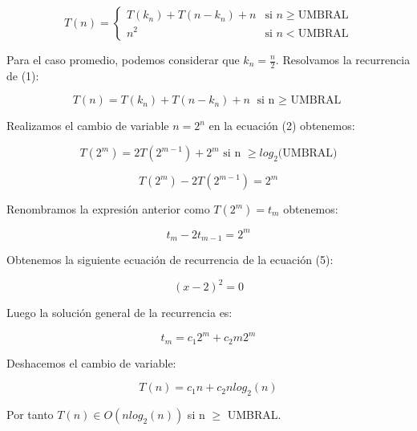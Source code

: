 \documentclass{homework}
\begin{document}
    \begin{equation}
        T(n) = \left\{ \begin{array}{lr} T(k_n) + T(n-k_n) + n & \text{si } n \geq \text{UMBRAL}\\ n^2 & \text{si } n < \text{UMBRAL} \end{array} \right.
    \end{equation}

    Para el caso promedio, podemos considerar que $k_{n} = \frac{n}{2}$. Resolvamos la recurrencia de (1):
    
    \begin{equation}
        T(n) = T(k_n) + T(n-k_n) + n \text{ si n $\geq$ UMBRAL}
    \end{equation}

    Realizamos el cambio de variable $n = 2^{n}$ en la ecuación (2) obtenemos:

    \begin{equation}
        T(2^{m}) = 2T(2^{m-1}) + 2^{m} \text{ si n $\geq log_{2}$(UMBRAL)} 
    \end{equation}

    \begin{equation}
        T(2^{m}) - 2T(2^{m-1}) = 2^{m}
    \end{equation}

    Renombramos la expresión anterior como $T(2^{m}) = t_{m}$ obtenemos:

    \begin{equation}
        t_{m} - 2t_{m-1} = 2^{m}
    \end{equation}
    
    Obtenemos la siguiente ecuación de recurrencia de la ecuación (5):

    \begin{equation}
        (x-2)^{2} = 0
    \end{equation}

    Luego la solución general de la recurrencia es:

    \begin{equation}
        t_{m} = c_{1}2^{m} + c_{2}m2^{m}
    \end{equation}

    Deshacemos el cambio de variable:

    \begin{equation}
        T(n) = c_{1}n + c_{2}nlog_{2}(n)
    \end{equation}

    Por tanto $T(n) \in O(nlog_{2}(n))$ si n $\geq$ UMBRAL.
    
\end{document}
